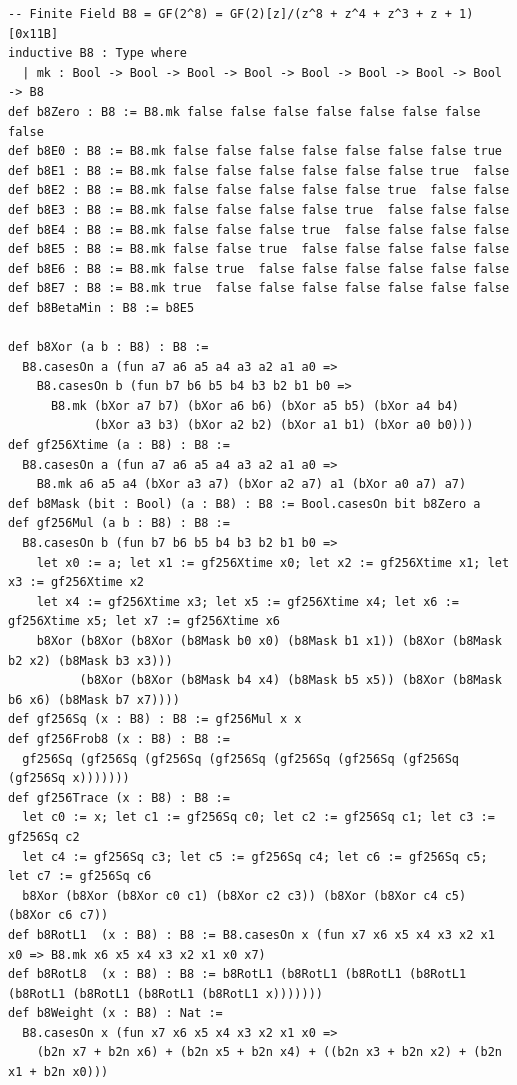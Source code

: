 \documentclass[11pt,letterpaper]{article}
\theoremstyle{spectralthm}
\begin{document}
\begin{lstlisting}[language=Lean4,caption={Standalone Pure Init.Prelude Term-Mode Lean 4 Kernel Suite (thm30--thm61, v0.0.0, 0 sorry, 0 axioms).},label={lst:lean_unified}]
-- Finite Field B8 = GF(2^8) = GF(2)[z]/(z^8 + z^4 + z^3 + z + 1) [0x11B]
inductive B8 : Type where
  | mk : Bool -> Bool -> Bool -> Bool -> Bool -> Bool -> Bool -> Bool -> B8
def b8Zero : B8 := B8.mk false false false false false false false false
def b8E0 : B8 := B8.mk false false false false false false false true
def b8E1 : B8 := B8.mk false false false false false false true  false
def b8E2 : B8 := B8.mk false false false false false true  false false
def b8E3 : B8 := B8.mk false false false false true  false false false
def b8E4 : B8 := B8.mk false false false true  false false false false
def b8E5 : B8 := B8.mk false false true  false false false false false
def b8E6 : B8 := B8.mk false true  false false false false false false
def b8E7 : B8 := B8.mk true  false false false false false false false
def b8BetaMin : B8 := b8E5

def b8Xor (a b : B8) : B8 :=
  B8.casesOn a (fun a7 a6 a5 a4 a3 a2 a1 a0 =>
    B8.casesOn b (fun b7 b6 b5 b4 b3 b2 b1 b0 =>
      B8.mk (bXor a7 b7) (bXor a6 b6) (bXor a5 b5) (bXor a4 b4)
            (bXor a3 b3) (bXor a2 b2) (bXor a1 b1) (bXor a0 b0)))
def gf256Xtime (a : B8) : B8 :=
  B8.casesOn a (fun a7 a6 a5 a4 a3 a2 a1 a0 =>
    B8.mk a6 a5 a4 (bXor a3 a7) (bXor a2 a7) a1 (bXor a0 a7) a7)
def b8Mask (bit : Bool) (a : B8) : B8 := Bool.casesOn bit b8Zero a
def gf256Mul (a b : B8) : B8 :=
  B8.casesOn b (fun b7 b6 b5 b4 b3 b2 b1 b0 =>
    let x0 := a; let x1 := gf256Xtime x0; let x2 := gf256Xtime x1; let x3 := gf256Xtime x2
    let x4 := gf256Xtime x3; let x5 := gf256Xtime x4; let x6 := gf256Xtime x5; let x7 := gf256Xtime x6
    b8Xor (b8Xor (b8Xor (b8Mask b0 x0) (b8Mask b1 x1)) (b8Xor (b8Mask b2 x2) (b8Mask b3 x3)))
          (b8Xor (b8Xor (b8Mask b4 x4) (b8Mask b5 x5)) (b8Xor (b8Mask b6 x6) (b8Mask b7 x7))))
def gf256Sq (x : B8) : B8 := gf256Mul x x
def gf256Frob8 (x : B8) : B8 :=
  gf256Sq (gf256Sq (gf256Sq (gf256Sq (gf256Sq (gf256Sq (gf256Sq (gf256Sq x)))))))
def gf256Trace (x : B8) : B8 :=
  let c0 := x; let c1 := gf256Sq c0; let c2 := gf256Sq c1; let c3 := gf256Sq c2
  let c4 := gf256Sq c3; let c5 := gf256Sq c4; let c6 := gf256Sq c5; let c7 := gf256Sq c6
  b8Xor (b8Xor (b8Xor c0 c1) (b8Xor c2 c3)) (b8Xor (b8Xor c4 c5) (b8Xor c6 c7))
def b8RotL1  (x : B8) : B8 := B8.casesOn x (fun x7 x6 x5 x4 x3 x2 x1 x0 => B8.mk x6 x5 x4 x3 x2 x1 x0 x7)
def b8RotL8  (x : B8) : B8 := b8RotL1 (b8RotL1 (b8RotL1 (b8RotL1 (b8RotL1 (b8RotL1 (b8RotL1 (b8RotL1 x)))))))
def b8Weight (x : B8) : Nat :=
  B8.casesOn x (fun x7 x6 x5 x4 x3 x2 x1 x0 =>
    (b2n x7 + b2n x6) + (b2n x5 + b2n x4) + ((b2n x3 + b2n x2) + (b2n x1 + b2n x0)))


\end{lstlisting}
\end{document}
